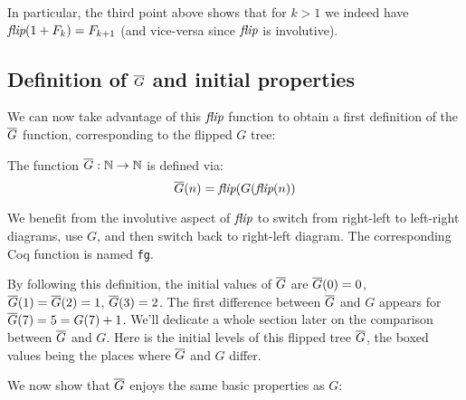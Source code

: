 \documentclass[a4paper,11pt]{article}
\begin{document}
In particular, the third point above shows that for $k>1$
we indeed have $\textit{flip}(1+F_k) = F_{k+1}$ (and vice-versa since $\textit{flip}$
is involutive).

\subsection{Definition of $\overline{G}$ and initial properties}

We can now take advantage of this $\textit{flip}$ function to obtain
a first definition of the $\overline{G}$ function, corresponding to the
flipped $G$ tree:

\begin{definition}
The function $\overline{G} : \mathbb{N}\to\mathbb{N}$ is defined via:
$$\overline{G}(n) = \textit{flip}(G(\textit{flip}(n))$$
\end{definition}

We benefit from the involutive aspect of $\textit{flip}$ to switch
from right-left to left-right diagrams, use $G$, and then
switch back to right-left diagram. The corresponding Coq function
is named {\tt fg}.

By following this definition, the initial values of $\overline{G}$ are
$\overline{G}(0)=0$, $\overline{G}(1)=\overline{G}(2)=1$, $\overline{G}(3)=2$. The first difference
between $\overline{G}$ and $G$ appears for $\overline{G}(7)=5=G(7)+1$. We'll dedicate a
whole section later on the comparison between $\overline{G}$ and $G$.
Here is the initial levels of this flipped tree $\overline{G}$,
the boxed values being the places where $\overline{G}$ and $G$ differ.

\bigskip


We now show that $\overline{G}$ enjoys the same basic properties as $G$:
\end{document}
